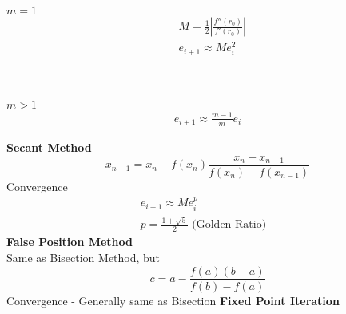 \documentclass[10pt]{article}
\begin{document}
\begin{multicols}{2}
\begin{minipage}{\columnwidth}
\begin{flushright}
\begin{multicols}{2}
                \begin{minipage}{1in}
                    \(m = 1\)
                    \begin{equation*}
                        \begin{aligned}
                            & M = \frac{1}{2} \left| \frac{f''(r_0)}{f'(r_0)} \right|  \\
                            & e_{i+1} \approx Me_i^2 \\
                        \end{aligned}
                    \end{equation*}
                \end{minipage} \\                
                \begin{minipage}{1in}                    
                    \(m > 1\)
                    \begin{equation*}
                        \begin{aligned}
                            e_{i+1} \approx \frac{m-1}{m} e_i
                        \end{aligned}
                    \end{equation*}
                \end{minipage}
            \end{multicols}
            \textbf{Secant Method}
            \begin{equation*}
                x_{n+1} = x_n - f(x_n)\frac{x_n - x_{n-1}}{f(x_n) - f(x_{n-1})}
            \end{equation*}
            Convergence
            \begin{equation*}
                \begin{aligned}
                    e_{i+1} \approx Me_i^p & \\
                    p = \frac{1 + \sqrt{5}}{2} \text{ (Golden Ratio)} &
                \end{aligned}
            \end{equation*}
            \textbf{False Position Method} \\
            Same as Bisection Method, but 
            \begin{equation*}
                c = a - \frac{f(a) (b-a)}{f(b) - f(a)}
            \end{equation*}
            Convergence - Generally same as Bisection
            \textbf{Fixed Point Iteration}
            \begin{enumerate}

\end{enumerate}
\end{flushright}
\end{minipage}
\end{multicols}
\end{document}
